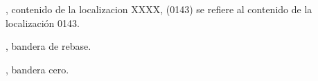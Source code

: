 \begin{description}[labelindent=1cm,labelwidth=2.25cm,align=left,leftmargin=3.45cm]
\item[$(XX)$], contenido de la localizacion XXXX, (0143) se refiere al contenido de la localización 0143.

\item[$V$], bandera de rebase.

\item[$Z$], bandera cero.



\end{description}

